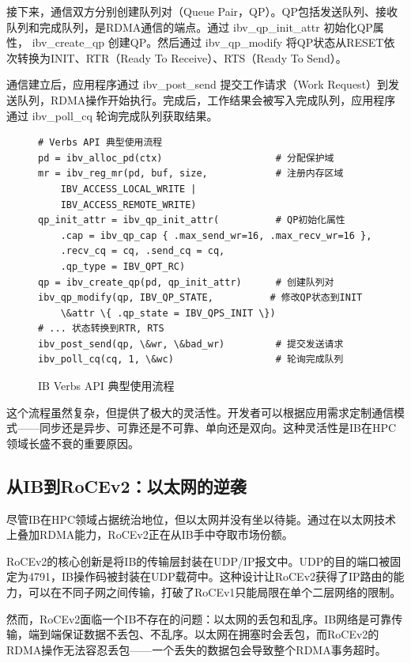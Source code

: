 接下来，通信双方分别创建队列对（Queue Pair，QP）。QP包括发送队列、接收队列和完成队列，是RDMA通信的端点。通过 ibv\_qp\_init\_attr 初始化QP属性， ibv\_create\_qp 创建QP。然后通过 ibv\_qp\_modify 将QP状态从RESET依次转换为INIT、RTR（Ready To Receive）、RTS（Ready To Send）。

通信建立后，应用程序通过 ibv\_post\_send 提交工作请求（Work Request）到发送队列，RDMA操作开始执行。完成后，工作结果会被写入完成队列，应用程序通过 ibv\_poll\_cq 轮询完成队列获取结果。

\begin{figure}[htbp]
\centering
\begin{verbatim}
# Verbs API 典型使用流程
pd = ibv_alloc_pd(ctx)                    # 分配保护域
mr = ibv_reg_mr(pd, buf, size,            # 注册内存区域
    IBV_ACCESS_LOCAL_WRITE | 
    IBV_ACCESS_REMOTE_WRITE)
qp_init_attr = ibv_qp_init_attr(          # QP初始化属性
    .cap = ibv_qp_cap { .max_send_wr=16, .max_recv_wr=16 },
    .recv_cq = cq, .send_cq = cq,
    .qp_type = IBV_QPT_RC)
qp = ibv_create_qp(pd, qp_init_attr)      # 创建队列对
ibv_qp_modify(qp, IBV_QP_STATE,          # 修改QP状态到INIT
    \&attr \{ .qp_state = IBV_QPS_INIT \})
# ... 状态转换到RTR, RTS
ibv_post_send(qp, \&wr, \&bad_wr)         # 提交发送请求
ibv_poll_cq(cq, 1, \&wc)                  # 轮询完成队列
\end{verbatim}
\caption{IB Verbs API 典型使用流程}
\label{fig:ib_verbs_flow}
\end{figure}

这个流程虽然复杂，但提供了极大的灵活性。开发者可以根据应用需求定制通信模式——同步还是异步、可靠还是不可靠、单向还是双向。这种灵活性是IB在HPC领域长盛不衰的重要原因。

\subsection{从IB到RoCEv2：以太网的逆袭}

尽管IB在HPC领域占据统治地位，但以太网并没有坐以待毙。通过在以太网技术上叠加RDMA能力，RoCEv2正在从IB手中夺取市场份额。

RoCEv2的核心创新是将IB的传输层封装在UDP/IP报文中。UDP的目的端口被固定为4791，IB操作码被封装在UDP载荷中。这种设计让RoCEv2获得了IP路由的能力，可以在不同子网之间传输，打破了RoCEv1只能局限在单个二层网络的限制。

然而，RoCEv2面临一个IB不存在的问题：以太网的丢包和乱序。IB网络是可靠传输，端到端保证数据不丢包、不乱序。以太网在拥塞时会丢包，而RoCEv2的RDMA操作无法容忍丢包——一个丢失的数据包会导致整个RDMA事务超时。

